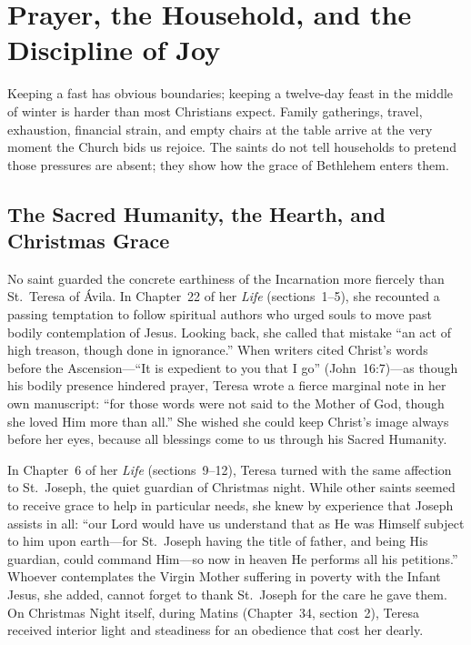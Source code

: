 \section{Prayer, the Household, and the Discipline of Joy}\label{sec:prayer-home}

Keeping a fast has obvious boundaries; keeping a twelve-day feast in the middle
of winter is harder than most Christians expect. Family gatherings, travel,
exhaustion, financial strain, and empty chairs at the table arrive at the very
moment the Church bids us rejoice. The saints do not tell households to pretend
those pressures are absent; they show how the grace of Bethlehem enters them.

\subsection{The Sacred Humanity, the Hearth, and Christmas Grace}

No saint guarded the concrete earthiness of the Incarnation more fiercely than
St.~Teresa of \'Avila. In Chapter~22 of her \textit{Life} (sections~1--5), she
recounted a passing temptation to follow spiritual authors who urged souls to
move past bodily contemplation of Jesus. Looking back, she called that mistake
``an act of high treason, though done in ignorance.'' When writers cited
Christ's words before the Ascension---``It is expedient to you that I go''
(John~16:7)---as though his bodily presence hindered prayer, Teresa wrote a
fierce marginal note in her own manuscript: ``for those words were not said to
the Mother of God, though she loved Him more than all.'' She wished she could
keep Christ's image always before her eyes, because all blessings come to us
through his Sacred Humanity.

In Chapter~6 of her \textit{Life} (sections~9--12), Teresa turned with the same
affection to St.~Joseph, the quiet guardian of Christmas night. While other
saints seemed to receive grace to help in particular needs, she knew by
experience that Joseph assists in all: ``our Lord would have us understand that
as He was Himself subject to him upon earth---for St.~Joseph having the title of
father, and being His guardian, could command Him---so now in heaven He performs
all his petitions.'' Whoever contemplates the Virgin Mother suffering in poverty
with the Infant Jesus, she added, cannot forget to thank St.~Joseph for the care
he gave them. On Christmas Night itself, during Matins (Chapter~34, section~2),
Teresa received interior light and steadiness for an obedience that cost her
dearly.

